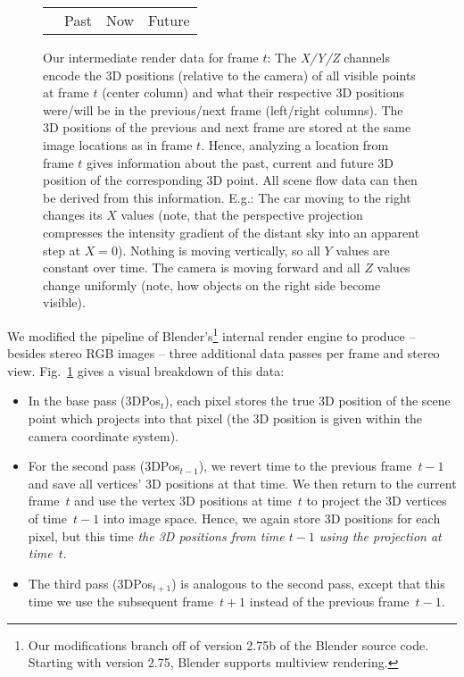 \documentclass[10pt,twocolumn,letterpaper]{article}
\begin{document}
\begin{figure}[t]
\begin{center}
{\begin{tabular}{cccc}
      & Past & Now & Future \\
      
    \end{tabular}%
  }%
  \end{center}%
  \caption{Our intermediate render data for frame $t$:
           The \emph{X/Y/Z} channels encode the 3D positions (relative to the camera) of all visible points at frame $t$ (center column) and what their respective 3D positions were/will be in the previous/next frame (left/right columns).
           The 3D positions of the previous and next frame are stored at the same image locations as in frame $t$. Hence, analyzing a location from frame $t$ gives information about the past, current and future 3D position of the corresponding 3D point. All scene flow data can then be derived from this information.
           E.g.: The car moving to the right changes its $X$ values (note, that the perspective projection compresses the intensity gradient of the distant sky into an apparent step at $X=0$).
           Nothing is moving vertically, so all $Y$ values are constant over time.
           The camera is moving forward and all $Z$ values change uniformly (note, how objects on the right side become visible). 
          }%
  \label{fig:pos3d-images}
\end{figure}


We modified the pipeline of Blender's\footnote{Our modifications branch off of version 2.75b of the Blender source code. Starting with version 2.75, Blender supports multiview rendering.} internal render engine to produce -- besides stereo RGB images -- three additional data passes per frame and stereo view.
Fig.~\ref{fig:pos3d-images} gives a visual breakdown of this data:
\begin{itemize}%
  \item In the base pass (3DPos$_t$), each pixel stores the true 3D position of the scene point which projects into that pixel (the 3D position is given within the camera coordinate system).

  \item For the second pass (3DPos$_{t-1}$), we revert time to the previous frame~$t\!-\!1$ and save all vertices' 3D positions at that time.
    We then return to the current frame~$t$ and use the vertex 3D positions at time~$t$ to project the 3D vertices of time~$t-1$ into image space. 
    Hence, we again store 3D positions for each pixel, but this time \emph{the 3D positions from time $t\!-\!1$ using the projection at time~$t$}.
  \item The third pass (3DPos$_{t+1}$) is analogous to the second pass, except that this time we use the subsequent frame~$t\!+\!1$ instead of the previous frame~$t\!-\!1$.
\end{itemize}%
\end{document}
